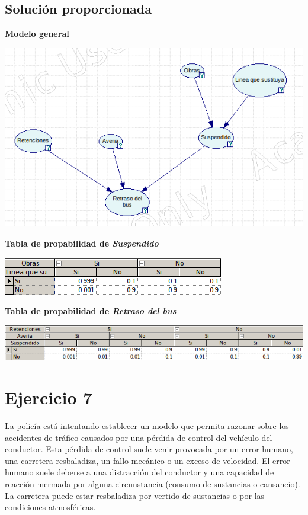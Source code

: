 \documentclass{article}
\begin{document}
\newpage

\subsection{Solución proporcionada}

\textbf{Modelo general}

\begin{center}
\includegraphics[scale=0.5]{Modelo6.png}
\end{center}

\textbf{Tabla de propabilidad de \textit{Suspendido}}

\begin{center}
\includegraphics[scale=0.5]{Suspendido.png}
\end{center}

\textbf{Tabla de propabilidad de \textit{Retraso del bus}}

\begin{center}
\includegraphics[scale=0.5]{Retraso.png}
\end{center}

\section{Ejercicio 7}

La policía está intentando establecer un modelo que permita razonar sobre los accidentes de
tráfico causados por una pérdida de control del vehículo del conductor. Esta pérdida de control suele venir provocada por un error humano, una carretera resbaladiza, un fallo mecánico o un exceso de velocidad. El error humano suele deberse a una distracción del conductor y una capacidad de reacción mermada por alguna circunstancia (consumo de sustancias o cansancio). La carretera puede estar resbaladiza por vertido de sustancias o por las condiciones atmosféricas.
\end{document}
